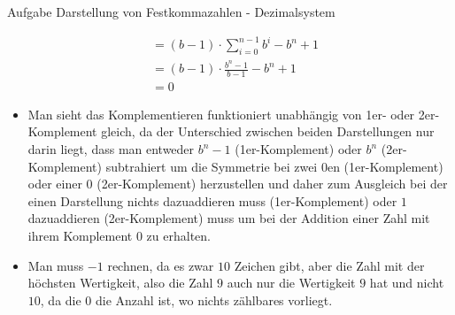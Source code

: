 \begin{frame}[allowframebreaks]{Aufgabe \thesection}{Darstellung von Festkommazahlen - Dezimalsystem}
\begin{solution}
\begin{itemize}
\begin{align*}
            &=(b-1)\cdot\sum_{i=0}^{n-1}b^{i}-b^{n}+1\\
            &=(b-1)\cdot\frac{b^{n}-1}{b-1}-b^{n}+1\\
            &=0
        \end{align*}
    \end{itemize}
  \end{solution}
  \begin{Sidenote}
    \begin{itemize}
        \item Man sieht das Komplementieren funktioniert unabhängig von 1er- oder 2er-Komplement gleich, da der Unterschied zwischen beiden Darstellungen nur darin liegt, dass man entweder $b^n-1$ (1er-Komplement) oder $b^n$ (2er-Komplement) subtrahiert um die Symmetrie bei zwei 0en (1er-Komplement) oder einer 0 (2er-Komplement) herzustellen und daher zum Ausgleich bei der einen Darstellung nichts dazuaddieren muss (1er-Komplement) oder $1$ dazuaddieren (2er-Komplement) muss um bei der Addition einer Zahl mit ihrem Komplement $0$ zu erhalten. 
        \item Man muss $-1$ rechnen, da es zwar $10$ Zeichen gibt, aber die Zahl mit der höchsten Wertigkeit, also die Zahl $9$ auch nur die Wertigkeit $9$ hat und nicht $10$, da die $0$ die Anzahl ist, wo nichts zählbares vorliegt.
    \end{itemize}
  \end{Sidenote}
\end{frame}
